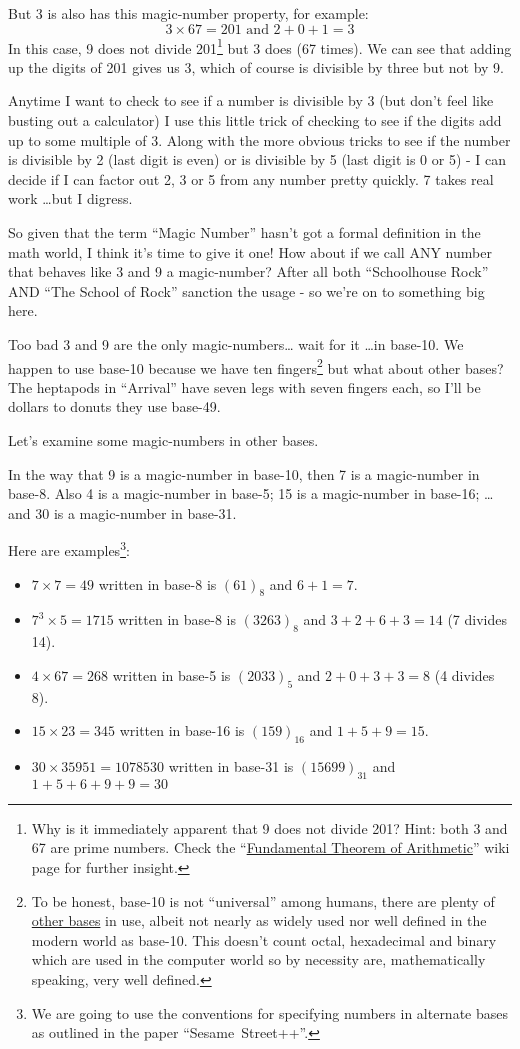 \documentclass{article}
\begin{document}
But 3 is also has this magic-number property, for example:
\[ 3\times{}67=201 \text{ and } 2+0+1=3\]
In this case, 9 does not divide 201\footnote{Why is it immediately apparent that 9 does not divide 201? Hint: both 3 and 67 are prime numbers.
Check the ``\href{https://en.wikipedia.org/wiki/Fundamental_theorem_of_arithmetic}{Fundamental Theorem of Arithmetic}'' wiki page for further insight.}
but 3 does (67 times).
We can see that adding up the digits of 201 gives us 3, which of course is divisible by three but not by 9.

Anytime I want to check to see if a number is divisible
by 3 (but don't feel like busting out a calculator)
I use this little trick of checking to see if the digits add up to
some multiple of 3. Along with the more obvious tricks to see if the number is
divisible by 2 (last digit is even) or is divisible 
by 5 (last digit is 0 or 5) - I can decide if I can factor out 2, 3 or 5 from any number pretty quickly.
7 takes real work \dots{}but I digress.

So given that the term ``Magic Number'' hasn't got a formal definition in the math world, I think it's time to give it one!
How about if we call ANY number that behaves like 3 and 9 a magic-number?
After all both ``Schoolhouse Rock'' AND ``The School of Rock'' sanction the usage - so we're on
to something big here.

Too bad 3 and 9 are the only magic-numbers\dots{} wait for it \dots{}in base-10.
We happen to use base-10 because we have ten fingers\footnote{To be honest, base-10 is
not ``universal'' among humans, there are plenty of
\href{https://www.youtube.com/watch?v=l4bmZ1gRqCc}{other bases} in use, albeit not nearly
as widely used nor well defined in the modern world as base-10. This doesn't count
octal, hexadecimal and binary which are used in the computer world
so by necessity are, mathematically speaking, very well defined.} but what about other bases?
The heptapods in ``Arrival'' have seven legs with seven fingers each,
so I'll be dollars to donuts they use base-49.

Let's examine some magic-numbers in other bases.

In the way that 9 is a magic-number in base-10, then 7 is a magic-number in base-8.
Also 4 is a magic-number in base-5;
15 is a magic-number in base-16;
\dots{}and 30 is a magic-number in base-31.

Here are examples\footnote{We are going to use the conventions for specifying
numbers in alternate bases as outlined in the paper ``Sesame~Street++''.}:
\begin{itemize}
\item $7\times{}7=49$ written in base-8 is $(61)_8$ and $6+1=7$.
\item $7^3\times{}5=1715$ written in base-8 is $(3263)_8$ and $3+2+6+3=14$ (7 divides 14).
\item $4\times{}67=268$ written in base-5 is $(2033)_5$ and $2+0+3+3=8$ (4 divides 8).
\item $15\times{}23=345$ written in base-16 is $(159)_{16}$ and $1+5+9=15$.
\item $30\times{}35951=1078530$ written in base-31 is $(15699)_{31}$ and $1+5+6+9+9=30$
\end{itemize}
\end{document}
